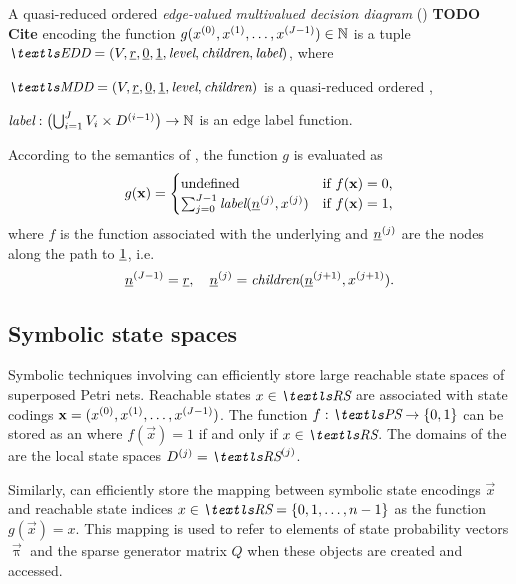 \begin{dfn}
  A quasi-reduced ordered \emph{edge-valued multivalued decision
    diagram} () \textbf{TODO Cite} encoding the function
  $g(x^{(0)},
  x^{(1)}, \ldots, x^{(J - 1)}) \in \mathbb{N}$ is a tuple $\EDD = (V,
  \ddnode{r}, \ddnode{0}, \ddnode{1}, \mddLevel, \mddChildren,
  \eddLabel)$, where
  \begin{asparaitem}
  \item $\MDD = (V, \ddnode{r}, \ddnode{0}, \ddnode{1}, \mddLevel,
    \mddChildren)$ is a quasi-reduced ordered ,
  \item $\textit{label}: \bigl( \bigcup_{i = 1}^J V_i \times D^{(i
      - 1)} \bigr) \to \mathbb{N}$ is an edge label function.
  \end{asparaitem}
\end{dfn}

According to the semantics of , the function $g$ is
evaluated as
\begin{equation}
  g(\bm{\mathrm{x}}) = \begin{cases}
    \text{undefined}
    & \text{if $f(\bm{\mathrm{x}}) = 0$,} \\
    \sum_{j = 0}^{J - 1} \textit{label}(\underline{n}^{(j)}, x^{(j)})
    & \text{if $f(\bm{\mathrm{x}}) = 1$,}
  \end{cases}
\end{equation}
where $f$ is the function associated with the underlying 
and $\underline{n}^{(j)}$ are the nodes along the path to
$\underline{1}$, i.e.~
\begin{equation}
  \underline{n}^{(J - 1)} = \underline{r}, \quad \underline{n}^{(j)} =
  \textit{children}(\underline{n}^{(j + 1)}, x^{(j + 1)}) \text.
\end{equation}

\subsection{Symbolic state spaces}

Symbolic techniques involving  can efficiently store
large reachable state spaces of superposed Petri nets. Reachable
states $x \in \RS$ are associated with state codings $\bm{\mathrm{x}} =
(x^{(0)}, x^{(1)}, \ldots, x^{(J - 1)})$. The function $f:
\PS \to \{0, 1\}$ can be stored as an  where $f(\vec{x}) =
1$ if and only if $x \in \RS$. The domains of the  are the
local state spaces $\loc{D}{j} = \loc{\RS}{j}$.

Similarly,  can efficiently store the mapping between
symbolic state encodings $\vec{x}$ and reachable state indices $x \in
\RS = \{0, 1, \ldots, n - 1\}$ as the function $g(\vec{x}) = x$. This
mapping is used to refer to elements of state probability vectors
$\vec{\uppi}$ and the sparse generator matrix $Q$ when these objects
are created and accessed.

